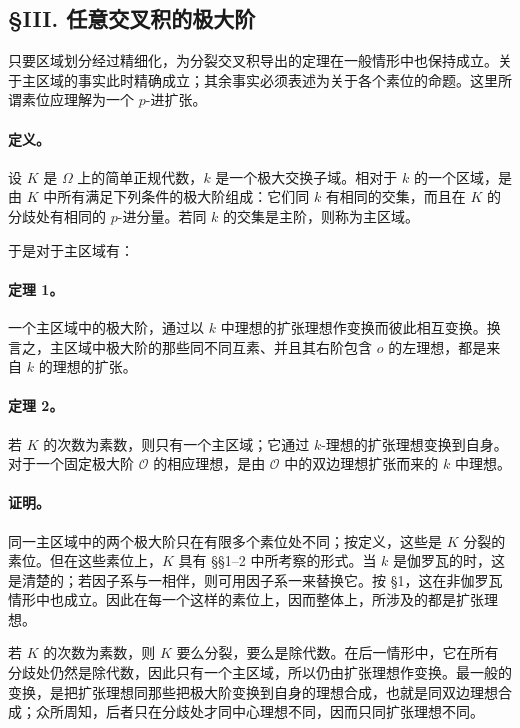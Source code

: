 \subsection*{§III. 任意交叉积的极大阶}

只要区域划分经过精细化，为分裂交叉积导出的定理在一般情形中也保持成立。关于主区域的事实此时精确成立；其余事实必须表述为关于各个素位的命题。这里所谓素位应理解为一个 \(p\)-进扩张。

\paragraph{定义。}
设 \(K\) 是 \(\Omega\) 上的简单正规代数，\(k\) 是一个极大交换子域。相对于 \(k\) 的一个区域，是由 \(K\) 中所有满足下列条件的极大阶组成：它们同 \(k\) 有相同的交集，而且在 \(K\) 的分歧处有相同的 \(p\)-进分量。若同 \(k\) 的交集是主阶，则称为主区域。

于是对于主区域有：

\paragraph{定理 1。}
一个主区域中的极大阶，通过以 \(k\) 中理想的扩张理想作变换而彼此相互变换。换言之，主区域中极大阶的那些同不同互素、并且其右阶包含 \(o\) 的左理想，都是来自 \(k\) 的理想的扩张。

\paragraph{定理 2。}
若 \(K\) 的次数为素数，则只有一个主区域；它通过 \(k\)-理想的扩张理想变换到自身。对于一个固定极大阶 \(\mathcal O\) 的相应理想，是由 \(\mathcal O\) 中的双边理想扩张而来的 \(k\) 中理想。

\paragraph{证明。}
同一主区域中的两个极大阶只在有限多个素位处不同；按定义，这些是 \(K\) 分裂的素位。但在这些素位上，\(K\) 具有 §§1--2 中所考察的形式。当 \(k\) 是伽罗瓦的时，这是清楚的；若因子系与一相伴，则可用因子系一来替换它。按 §1，这在非伽罗瓦情形中也成立。因此在每一个这样的素位上，因而整体上，所涉及的都是扩张理想。

若 \(K\) 的次数为素数，则 \(K\) 要么分裂，要么是除代数。在后一情形中，它在所有分歧处仍然是除代数，因此只有一个主区域，所以仍由扩张理想作变换。最一般的变换，是把扩张理想同那些把极大阶变换到自身的理想合成，也就是同双边理想合成；众所周知，后者只在分歧处才同中心理想不同，因而只同扩张理想不同。

